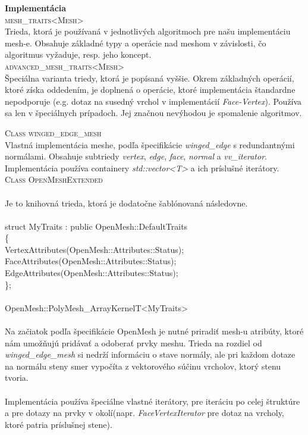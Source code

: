 \documentclass{article}
\begin{document}
\textbf{Implementácia}
\\


\textsc{mesh\_traits\textless Mesh\textgreater}
\\

Trieda, ktorá je používaná v jednotlivých algoritmoch pre našu implementáciu mesh-e. Obsahuje základné typy a operácie nad meshom
v závislosti, čo algoritmus vyžaduje, resp. jeho koncept.
\\


\textsc{advanced\_mesh\_traits\textless Mesh\textgreater}
\\

Špeciálna varianta triedy, ktorá je popísaná vyššie. Okrem základných operácií, ktoré získa oddedením, je doplnená o operácie, ktoré
implementácia štandardne nepodporuje (e.g. dotaz na susedný vrchol v implementácií \emph{Face-Vertex}). Používa sa len v špeciálnych
prípadoch. Jej značnou nevýhodou je spomalenie algoritmov.
\\
\newpage

\textsc{Class winged\_edge\_mesh}
\\

Vlastná implementácia mesh\-e, podľa špecifikácie \emph{winged\_edge} s redundantnými normálami. Obsahuje subtriedy \emph{vertex}, \emph{edge}, \emph{face}, \emph{normal} a \emph{vv\_iterator}. Implementácia používa containery \emph{std::vector\textless T\textgreater}
a ich príslušné iterátory.
\\

\textsc{Class OpenMeshExtended}
\\
\\
Je to knihovná trieda, ktorá je dodatočne šablónovaná následovne.\\
\\
\textsf{
struct MyTraits : public OpenMesh::DefaultTraits\\
\{\\
 VertexAttributes(OpenMesh::Attributes::Status);\\
 FaceAttributes(OpenMesh::Attributes::Status);\\
 EdgeAttributes(OpenMesh::Attributes::Status);\\
\};\\
\\
OpenMesh::PolyMesh\_ArrayKernelT\textless MyTraits\textgreater
}\\
\\
Na začiatok podľa špecifikácie OpenMesh je nutné priradiť mesh-u atribúty, ktoré nám umožňujú pridávať a odoberať prvky meshu.
Trieda na rozdiel od \emph{winged\_edge\_mesh} si nedrží informáciu o stave normály, ale pri každom dotaze na normálu steny smer vypočíta
z vektorového súčinu vrcholov, ktorý stenu tvoria.\\
\\
Implementácia používa špeciálne vlastné iterátory, pre iteráciu po celej štruktúre a pre dotazy na prvky v okolí(napr. \emph{FaceVertexIterator} pre dotaz na vrcholy, ktoré patria príslušnej stene).
\\
\\
\end{document}
